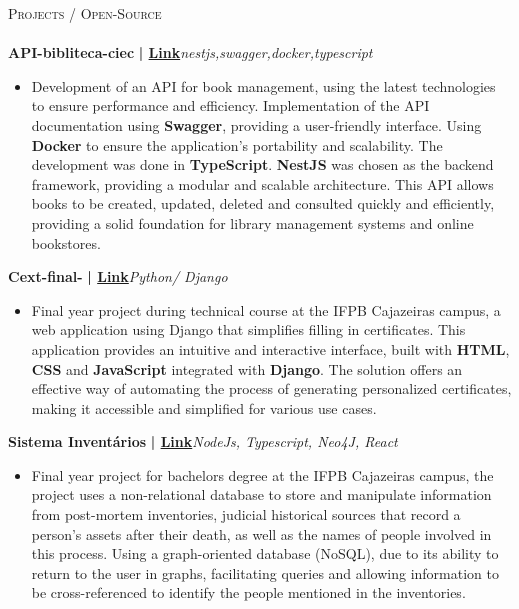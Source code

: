 \documentclass[a4paper]{article}
\newcommand{\lineunder} {
    \vspace*{-8pt} \\
    \hspace*{-18pt} \hrulefill \\
}
\newcommand{\header} [1] {
    {\hspace*{-18pt}\vspace*{6pt} \textsc{#1}}
    \vspace*{-6pt} \lineunder
}
\begin{document}
%
%
\header{Projects / Open-Source}
\vspace{2mm}
{\textbf{API-bibliteca-ciec}}\textbf{ | \href{https://github.com/Alttabcorp/API-bibliteca_siec}{Link}}\hfill{\sl nestjs,swagger,docker,typescript}\\
\vspace{-3mm}
\begin{itemize} \itemsep -3pt
    \item[] Development of an API for book management, using the latest technologies to ensure performance and efficiency.
        Implementation of the API documentation using \textbf{Swagger}, providing a user-friendly interface. Using \textbf{Docker} to ensure the application's portability and scalability.
        The development was done in \textbf{TypeScript}. \textbf{NestJS} was chosen as the backend framework, providing a modular and scalable architecture.
        This API allows books to be created, updated, deleted and consulted quickly and efficiently, providing a solid foundation for library management systems and online bookstores.
\end{itemize}
\vspace*{3mm}
{\textbf{Cext-final-}}\textbf{ | \href{https://github.com/bodescorp/Cext-final-}{Link}}\hfill{\sl Python/ Django }\\
\vspace{-3mm}
\begin{itemize} \itemsep -3pt
    \item[] Final year project during technical course at the IFPB Cajazeiras campus, a web application using Django that simplifies filling in certificates. This application provides an intuitive and interactive interface, built with \textbf{HTML}, \textbf{CSS} and \textbf{JavaScript} integrated with \textbf{Django}. The solution offers an effective way of automating the process of generating personalized certificates, making it accessible and simplified for various use cases.
\end{itemize}
\vspace*{3mm}
{\textbf{Sistema Inventários}}\textbf{ | \href{https://repositorio.ifpb.edu.br/handle/177683/2898}{Link}}\hfill{\sl NodeJs, Typescript, Neo4J, React }\\
\vspace{-3mm}
\begin{itemize} \itemsep -3pt
    \item[] Final year project for bachelors degree at the IFPB Cajazeiras campus, the project uses a non-relational database to store and manipulate information from post-mortem inventories, judicial historical sources that record a person's assets after their death, as well as the names of people involved in this process. Using a graph-oriented database (NoSQL), due to its ability to return to the user in graphs, facilitating queries and allowing information to be cross-referenced to identify the people mentioned in the inventories.
\end{itemize}
\vspace*{3mm}
\end{document}
